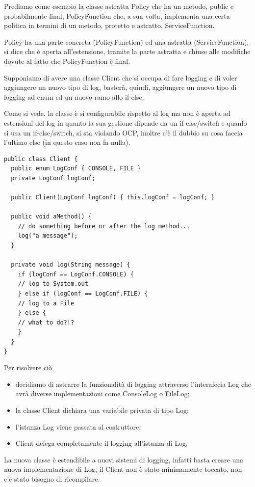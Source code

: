 Prediamo come esempio la classe astratta Policy che ha un metodo, public e probabilmente final, PolicyFunction che, a sua volta, implementa una certa politica in 
termini di un metodo, protetto e astratto, ServiceFunction.

Policy ha una parte concreta (PolicyFunction) ed una astratta (ServiceFunction), si dice che è aperta all'estensione, tramite la parte astratta e chiuse alle modifiche 
dovute al fatto che PolicyFunction è final.
\smallskip

Supponiamo di avere una classe Client che si occupa di fare logging e di voler aggiungere un nuovo tipo di log, basterà, quindi, aggiungere un nuovo tipo di logging ad 
enum ed un nuovo ramo allo if-else.

Come si vede, la classe è si configurabile rispetto al log ma non è aperta ad estensioni del log in quanto la sua gestione dipende da un if-else/switch e quanfo si usa 
un if-else/switch, si sta violando OCP, inoltre c'è il dubbio su cosa faccia l'ultimo else (in questo caso non fa nulla).

\begin{lstlisting}[linewidth=10cm]
public class Client {
  public enum LogConf { CONSOLE, FILE }
  private LogConf logConf;
  
  public Client(LogConf logConf) { this.logConf = logConf; }
  
  public void aMethod() {
    // do something before or after the log method...
    log("a message");
  }

  private void log(String message) {
    if (logConf == LogConf.CONSOLE) {
    // log to System.out
    } else if (logConf == LogConf.FILE) {
    // log to a File
    } else {
    // what to do?!?
    }
  }
}
\end{lstlisting}

\newpage
Per risolvere ciò
\begin{itemize}
  \item decidiamo di astrarre la funzionalità di logging attraverso l'interafccia Log che avrà diverse implementazioni come ConsoleLog o FileLog;
  \item la classe Client dichiara una variabile privata di tipo Log;
  \item l’istanza Log viene passata al costruttore;
  \item Client delega completamente il logging all’istanza di Log.
\end{itemize}

La nuova classe è estendibile a nuovi sistemi di logging, infatti basta creare una nuova implementazione di Log, il Client non è stato minimamente toccato, non c'è 
stato bisogno di ricompilare.

